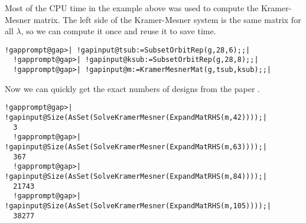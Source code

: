 \documentclass[a4paper,11pt]{report}
\begin{document}
{{{ Most of the CPU time in the example above was used to compute the
Kramer-Mesner matrix. The left side of the Kramer-Mesner system is the same
matrix for all $\lambda$, so we can compute it once and reuse it to save time. 
\begin{Verbatim}[commandchars=!@|,fontsize=\small,frame=single,label=Example]
  !gapprompt@gap>| !gapinput@tsub:=SubsetOrbitRep(g,28,6);;|
  !gapprompt@gap>| !gapinput@ksub:=SubsetOrbitRep(g,28,8);;|
  !gapprompt@gap>| !gapinput@m:=KramerMesnerMat(g,tsub,ksub);;|
\end{Verbatim}
 Now we can quickly get the exact numbers of designs from the paper \cite{BS93}. 
\begin{Verbatim}[commandchars=!@|,fontsize=\small,frame=single,label=Example]
  !gapprompt@gap>| !gapinput@Size(AsSet(SolveKramerMesner(ExpandMatRHS(m,42))));|
  3
  !gapprompt@gap>| !gapinput@Size(AsSet(SolveKramerMesner(ExpandMatRHS(m,63))));|
  367
  !gapprompt@gap>| !gapinput@Size(AsSet(SolveKramerMesner(ExpandMatRHS(m,84))));|
  21743
  !gapprompt@gap>| !gapinput@Size(AsSet(SolveKramerMesner(ExpandMatRHS(m,105))));|
  38277
\end{Verbatim}
 }

 
}}
\end{document}
